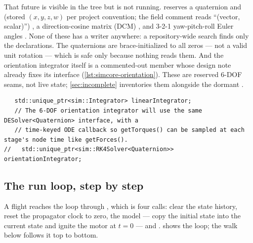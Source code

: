 That future is visible in the tree but is not running.  reserves a quaternion
 and  (stored $(x,y,z,w)$ per project convention; the
field comment reads ``(vector, scalar)'') , a direction-cosine matrix
(DCM) , and 3-2-1 yaw-pitch-roll Euler angles
. None of these has a writer anywhere: a repository-wide search finds
only the declarations. The quaternions are brace-initialized to all zeros --- not a valid unit
rotation --- which is safe only because nothing reads them. And the orientation integrator itself
is a commented-out member whose design note already fixes its interface
(\cref{lst:simcore-orientation}). These are reserved 6-DOF seams, not live state;
\cref{sec:incomplete} inventories them alongside the dormant .

\begin{listing}[htbp]
\begin{verbatim}
   std::unique_ptr<sim::Integrator> linearIntegrator;
   // The 6-DOF orientation integrator will use the same DESolver<Quaternion> interface, with a
   // time-keyed ODE callback so getTorques() can be sampled at each stage's node time like getForces().
//   std::unique_ptr<sim::RK4Solver<Quaternion>> orientationIntegrator;
\end{verbatim}
\caption{The other half of the problem, waiting : the linear
integrator is live; the orientation integrator is a commented-out member whose comment already
names the interface and the sampling discipline it will use.}\label{lst:simcore-orientation}
\end{listing}

\subsection{The run loop, step by step}\label{sec:simcore-loop}

A flight reaches the loop through , which is four calls: clear the
state history, reset the propagator clock to zero,  the model --- copy the initial
state into the current state and ignite the motor at $t=0$  ---
and  .  shows the loop;
the walk below follows it top to bottom.


